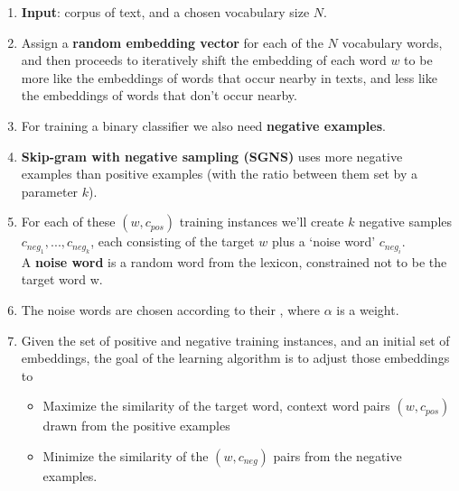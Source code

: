 \begin{enumerate}
    \item \textbf{Input}: corpus of text, and a chosen vocabulary size $N$.

    \item Assign a \textbf{random embedding vector} for each of the $N$ vocabulary words, and then proceeds to iteratively shift the embedding of each word $w$ to be more like the embeddings of words that occur nearby in texts, and less like the embeddings of words that don’t occur nearby.

    \item For training a binary classifier we also need \textbf{negative examples}.
    
    \item \textbf{Skip-gram with negative sampling (SGNS)} uses more negative examples than positive examples (with the ratio between them set by a parameter $k$).

    \item For each of these $(w, c_{pos})$ training instances we’ll create $k$ negative samples $c_{neg_1},...,c_{neg_k}$, each consisting of the target $w$ plus a ‘noise word’ $c_{neg_i}$.\\
    A \textbf{noise word} is a random word from the lexicon, constrained not to be the target word w.

    \item The noise words are chosen according to their , where $\alpha$ is a weight.

    \item Given the set of positive and negative training instances, and an initial set of embeddings, the goal of the learning algorithm is to adjust those embeddings to
    \begin{itemize}
        \item Maximize the similarity of the target word, context word pairs $(w, c_{pos})$ drawn from the positive examples
        \item  Minimize the similarity of the $(w, c_{neg})$ pairs from the negative examples.
    \end{itemize}


\end{enumerate}
